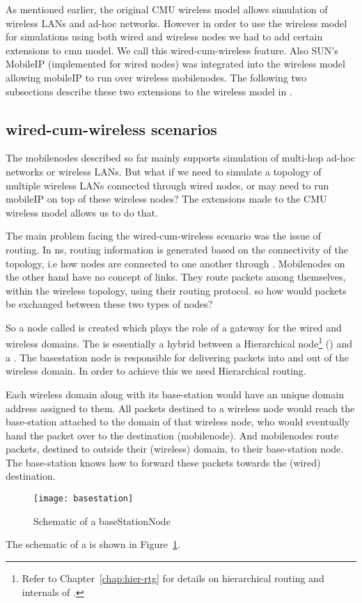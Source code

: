 {As mentioned earlier, the original CMU wireless model allows
simulation of wireless LANs and ad-hoc networks. However in order to
use the wireless model for simulations using both wired and wireless
nodes we had to add certain extensions to cmu model. We 
call this wired-cum-wireless feature. Also SUN's MobileIP (implemented
for wired nodes) was integrated into the wireless model allowing
mobileIP to run over wireless mobilenodes. The following two
subsections describe these two extensions to the wireless 
model in \ns. 


\subsection{wired-cum-wireless scenarios}
\label{sec:wired-cum-wireless}

The mobilenodes described so far mainly supports simulation of
multi-hop ad-hoc networks or wireless LANs. But what if we need to
simulate a topology of multiple wireless LANs connected through wired
nodes, or may need to run mobileIP on top of these wireless nodes? The
extensions made to the CMU wireless model allows us to do that. 

The main problem facing the wired-cum-wireless scenario was the issue
of routing. In ns, routing information is generated based on the
connectivity of the topology, i.e how nodes are connected to one
another through . Mobilenodes on the other hand have no
concept of links. They route packets among themselves, within the
wireless topology, using their routing protocol. so how would packets
be exchanged between these two types of nodes? 

So a node called  is created which plays the
role of a gateway for the wired and wireless domains. The
 is essentially a hybrid between a Hierarchical
node\footnote{Refer to Chapter~\ref{chap:hier-rtg} for details on
  hierarchical routing and internals of .}
() and a . The basestation node is
responsible for delivering packets into and out of the wireless
domain. In order to achieve this we need Hierarchical routing. 

Each wireless domain along with its base-station would have an unique
domain address assigned to them. All packets destined to a wireless
node would reach the base-station attached to the domain of that
wireless node, who would eventually hand the packet
over to the destination (mobilenode). And mobilenodes route packets,
destined to outside their (wireless) domain, to their base-station
node. The base-station knows how to forward these packets towards the
(wired) destination.
\begin{figure}
    \centerline{\texttt{[image: basestation]}}
    \caption{Schematic of a baseStationNode}
    \label{fig:mobilenode-basestation}
\end{figure}
The schematic of a  is shown in
Figure~\ref{fig:mobilenode-basestation}.

}
